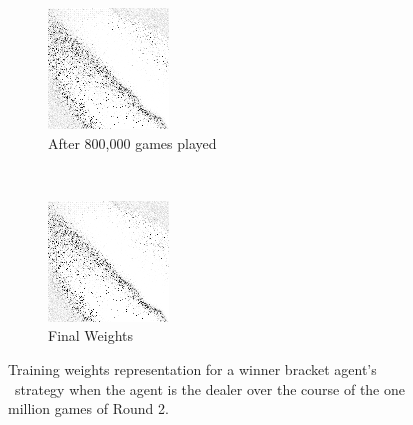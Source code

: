 \begin{figure}
	\begin{subfigure}[b]{0.4\textwidth}
	\includegraphics[width=\linewidth]{images/findings/round2/flipbook/random/checkpoint_800000.png}
	\caption{After 800,000 games played}
	\end{subfigure}
	~
	\begin{subfigure}[b]{0.4\textwidth}
	\includegraphics[width=\linewidth]{images/findings/round2/flipbook/random/checkpoint_999999.png}
	\caption{Final Weights}
	\end{subfigure}

\caption{
	Training weights representation for a winner bracket agent's \handmaxavg\
	strategy when the agent is the dealer
	over the course of the one million games of Round 2.
}
\label{fig:r2-flip-random}
\end{figure}
